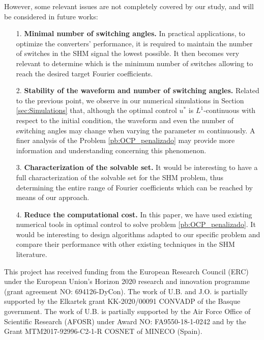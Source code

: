 \documentclass[twocolumn]{autart}    %
\begin{document}
However, some relevant issues are not completely covered by our study, and will be considered in future works:
\begin{itemize}
	\item[1.] \textbf{Minimal number of switching angles.} In practical applications, to optimize the converters' performance, it is required to maintain the number of switches in the SHM signal the lowest possible. It then becomes very relevant to determine which is the minimum number of switches allowing to reach the desired target Fourier coefficients.
	\item[2.] \textbf{Stability of the waveform and number of switching angles.} Related to the previous point, we observe in our numerical simulations in Section \ref{sec:Simulations} that, although the optimal control $u^\ast$ is $L^1$-continuous with respect to the initial condition,  the waveform and even the number of switching angles may change when varying the parameter $m$ continuously.  
A finer analysis of the Problem \ref{pb:OCP_penalizado} may provide more information and understanding concerning this phenomenon. 
	\item[3.] \textbf{Characterization of the solvable set.} It would be interesting to have a full characterization of the solvable set for the SHM problem, thus determining the entire range of Fourier coefficients which can be reached by means of our approach.
	\item[4.] \textbf{Reduce the computational cost.} In this paper,  we have used existing numerical tools in optimal control to solve problem \ref{pb:OCP_penalizado}.
	It would be interesting to design algorithms adapted to our specific problem and compare their performance with other existing techniques in the SHM literature.
\end{itemize}

\begin{ack}            
	This project has received funding from the European Research Council (ERC) under the European Union’s Horizon 2020 research and innovation programme (grant agreement NO: 694126-DyCon). The work of U.B. and J.O. is partially supported by the Elkartek grant KK-2020/00091 CONVADP of the Basque government. The work of U.B. is partially supported by the Air Force Office of Scientific Research (AFOSR) under Award NO: FA9550-18-1-0242 and by the Grant MTM2017-92996-C2-1-R COSNET of MINECO (Spain).
\end{ack}

\end{document}
